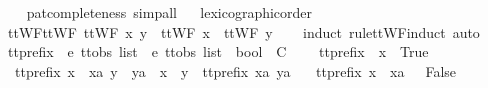 \begin{isabellebody}
%
\isadelimproof
\ \ %
\endisadelimproof
%
\isatagproof
{}\isamarkupfalse%
\ {\isacharparenleft}pat{\isacharunderscore}completeness{\isacharcomma}\ simp{\isacharunderscore}all{\isacharparenright}%
\endisatagproof
{\isafoldproof}%
%
\isadelimproof
\isanewline
%
\endisadelimproof
{}\isamarkupfalse%
%
\isadelimproof
\ %
\endisadelimproof
%
\isatagproof
{}\isamarkupfalse%
\ lexicographic{\isacharunderscore}order%
\endisatagproof
{\isafoldproof}%
%
\isadelimproof
%
\endisadelimproof
\isanewline
\isanewline
{}\isamarkupfalse%
\isanewline
\isanewline
{}\isamarkupfalse%
\ ttWF{}{\isacharunderscore}ttWF{\isacharcolon}\ {\isachardoublequoteopen}ttWF{}\ x\ y\ {\isacharequal}\ {\isacharparenleft}ttWF\ x\ {\isasymand}\ ttWF\ y{\isacharparenright}{\isachardoublequoteclose}\isanewline
%
\isadelimproof
\ \ %
\endisadelimproof
%
\isatagproof
{}\isamarkupfalse%
\ {\isacharparenleft}induct\ rule{\isacharcolon}ttWF{}{\isachardot}induct{\isacharcomma}\ auto{\isacharparenright}%
\endisatagproof
{\isafoldproof}%
%
\isadelimproof
%
\endisadelimproof
%
\isadelimdocument
%
\endisadelimdocument
%
\isatagdocument
%
\isamarkuptrue%
%
\isamarkuptrue%
%
\endisatagdocument
{\isafolddocument}%
%
\isadelimdocument
%
\endisadelimdocument
{}\isamarkupfalse%
\ tt{\isacharunderscore}prefix\ {\isacharcolon}{\isacharcolon}\ {\isachardoublequoteopen}{\isacharprime}e\ ttobs\ list\ {\isasymRightarrow}\ {\isacharprime}e\ ttobs\ list\ {\isasymRightarrow}\ bool{\isachardoublequoteclose}\ {\isacharparenleft}\ {\isachardoublequoteopen}{\isasymle}\isactrlsub C{\isachardoublequoteclose}\ {}{}{\isacharparenright}\ \isanewline
\ \ {\isachardoublequoteopen}tt{\isacharunderscore}prefix\ {\isacharbrackleft}{\isacharbrackright}\ x\ {\isacharequal}\ True{\isachardoublequoteclose}\ {\isacharbar}\isanewline
\ \ {\isachardoublequoteopen}tt{\isacharunderscore}prefix\ {\isacharparenleft}x\ {\isacharhash}\ xa{\isacharparenright}\ {\isacharparenleft}y\ {\isacharhash}\ ya{\isacharparenright}\ {\isacharequal}\ {\isacharparenleft}x\ {\isacharequal}\ y\ {\isasymand}\ tt{\isacharunderscore}prefix\ xa\ ya{\isacharparenright}{\isachardoublequoteclose}\ {\isacharbar}\isanewline
\ \ {\isachardoublequoteopen}tt{\isacharunderscore}prefix\ {\isacharparenleft}x\ {\isacharhash}\ xa{\isacharparenright}\ {\isacharbrackleft}{\isacharbrackright}\ {\isacharequal}\ False{\isachardoublequoteclose}\isanewline

\end{isabellebody}
